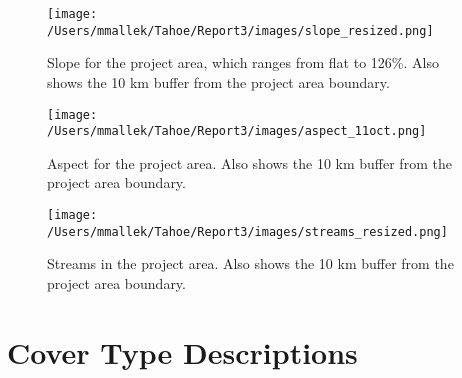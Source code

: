 \begin{figure}[htbp]
\centering
\texttt{[image: /Users/mmallek/Tahoe/Report3/images/slope\_resized.png]}
\caption{Slope for the project area, which ranges from flat to 126\%. Also shows the 10 km buffer from the project area boundary.} 
\label{slopemap}
\end{figure}

\begin{figure}[htbp]
\centering
\texttt{[image: /Users/mmallek/Tahoe/Report3/images/aspect\_11oct.png]}
\caption{Aspect for the project area. Also shows the 10 km buffer from the project area boundary.} 
\label{aspectmap}
\end{figure}

\begin{figure}[htbp]
\centering
\texttt{[image: /Users/mmallek/Tahoe/Report3/images/streams\_resized.png]}
\caption{Streams in the project area. Also shows the 10 km buffer from the project area boundary.} 
\label{streamsmap}
\end{figure}

\chapter{Cover Type Descriptions}
\label{app:covertypedesc}

















